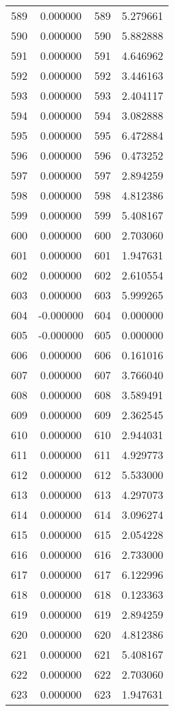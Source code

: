 \documentclass[12pt]{article}
\begin{document}
\begin{longtable}{@{}cccc@{}}
589 & 0.000000 & 589 & 5.279661 \\
590 & 0.000000 & 590 & 5.882888 \\
591 & 0.000000 & 591 & 4.646962 \\
592 & 0.000000 & 592 & 3.446163 \\
593 & 0.000000 & 593 & 2.404117 \\
594 & 0.000000 & 594 & 3.082888 \\
595 & 0.000000 & 595 & 6.472884 \\
596 & 0.000000 & 596 & 0.473252 \\
597 & 0.000000 & 597 & 2.894259 \\
598 & 0.000000 & 598 & 4.812386 \\
599 & 0.000000 & 599 & 5.408167 \\
600 & 0.000000 & 600 & 2.703060 \\
601 & 0.000000 & 601 & 1.947631 \\
602 & 0.000000 & 602 & 2.610554 \\
603 & 0.000000 & 603 & 5.999265 \\
604 & -0.000000 & 604 & 0.000000 \\
605 & -0.000000 & 605 & 0.000000 \\
606 & 0.000000 & 606 & 0.161016 \\
607 & 0.000000 & 607 & 3.766040 \\
608 & 0.000000 & 608 & 3.589491 \\
609 & 0.000000 & 609 & 2.362545 \\
610 & 0.000000 & 610 & 2.944031 \\
611 & 0.000000 & 611 & 4.929773 \\
612 & 0.000000 & 612 & 5.533000 \\
613 & 0.000000 & 613 & 4.297073 \\
614 & 0.000000 & 614 & 3.096274 \\
615 & 0.000000 & 615 & 2.054228 \\
616 & 0.000000 & 616 & 2.733000 \\
617 & 0.000000 & 617 & 6.122996 \\
618 & 0.000000 & 618 & 0.123363 \\
619 & 0.000000 & 619 & 2.894259 \\
620 & 0.000000 & 620 & 4.812386 \\
621 & 0.000000 & 621 & 5.408167 \\
622 & 0.000000 & 622 & 2.703060 \\
623 & 0.000000 & 623 & 1.947631 \\

\end{longtable}
\end{document}
